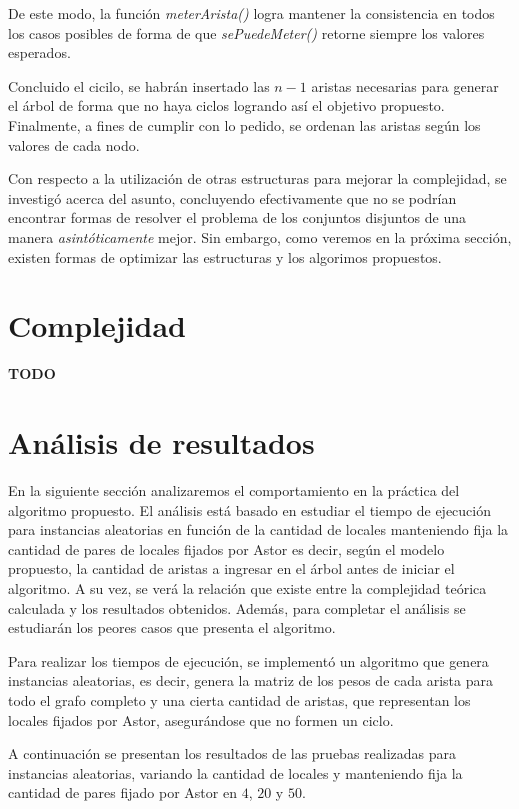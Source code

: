 \documentclass[a4paper,11pt] {article}
\begin{document}
De este modo, la función \textit{meterArista()} logra mantener la consistencia en todos los casos posibles de forma de que \textit{sePuedeMeter()} retorne siempre los valores esperados.

Concluido el cicilo, se habrán insertado las $n-1$ aristas necesarias para generar el árbol de forma que no haya ciclos logrando así el objetivo propuesto. Finalmente, a fines de cumplir con lo pedido, se ordenan las aristas según los valores de cada nodo.

Con respecto a la utilización de otras estructuras para mejorar la complejidad, se investigó acerca del asunto, concluyendo efectivamente que no se podrían encontrar formas de resolver el problema de los conjuntos disjuntos de una manera \textit{asintóticamente} mejor. Sin embargo, como veremos en la próxima sección, existen formas de optimizar las estructuras y los algorimos propuestos.

\section*{Complejidad}

\textbf{TODO}

\section*{An\'alisis de resultados}

En la siguiente secci\'on analizaremos el comportamiento en la pr\'actica del algoritmo propuesto. El an\'alisis est\'a basado en estudiar el tiempo de ejecuci\'on para instancias aleatorias en funci\'on de la cantidad de locales manteniendo fija la cantidad de pares de locales fijados por Astor es decir, seg\'un el modelo propuesto, la cantidad de aristas a ingresar en el \'arbol antes de iniciar el algoritmo. A su vez, se ver\'a la relaci\'on que existe entre la complejidad te\'orica calculada y los resultados obtenidos. Adem\'as, para completar el an\'alisis se estudiar\'an los peores casos que presenta el algoritmo.

Para realizar los tiempos de ejecuci\'on, se implement\'o un algoritmo que genera instancias aleatorias, es decir, genera la matriz de los pesos de cada arista para todo el grafo completo y una cierta cantidad de aristas, que representan los locales fijados por Astor, asegur\'andose que no formen un ciclo.

A continuaci\'on se presentan los resultados de las pruebas realizadas para instancias aleatorias, variando la cantidad de locales y manteniendo fija la cantidad de pares fijado por Astor en $4$, $20$ y $50$.
\end{document}

